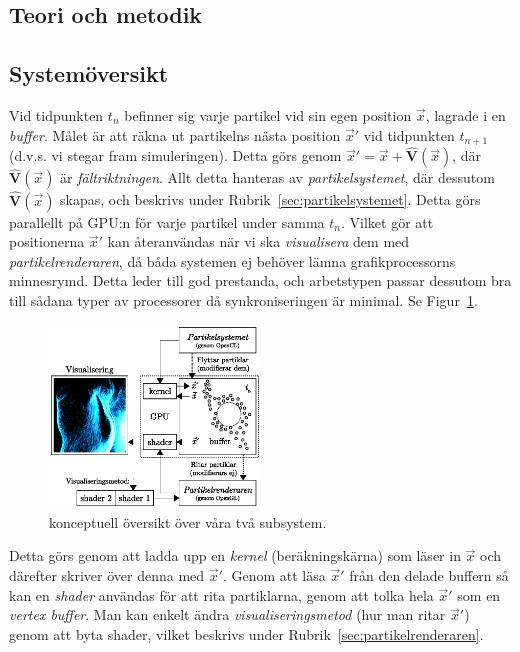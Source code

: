 \documentclass[a4paper]{article}
\begin{document}
\begin{multicols}{2}
    \section{Teori och metodik}
    \vspace{-0.3cm}
    \subsection{Systemöversikt} \label{sec:system}

    Vid tidpunkten \(t_n\) befinner sig varje partikel vid sin egen position \(\vec{x}\), lagrade i en \emph{buffer}. Målet är att räkna ut partikelns nästa position \(\vec{x}'\) vid tidpunkten \(t_{n+1}\) (d.v.s. vi stegar fram simuleringen). Detta görs genom \(\vec{x}' = \vec{x} + \mathbf{\hat{V}}(\vec{x})\), där \(\mathbf{\hat{V}}(\vec{x})\) är \emph{fältriktningen}. Allt detta hanteras av \emph{partikelsystemet}, där dessutom \(\mathbf{\hat{V}}(\vec{x})\) skapas, och beskrivs under Rubrik~\ref{sec:partikelsystemet}. Detta görs parallellt på GPU:n för varje partikel under samma \(t_n\). Vilket gör att positionerna \(\vec{x}'\) kan återanvändas när vi ska \emph{visualisera} dem med \emph{partikelrenderaren}, då båda systemen ej behöver lämna grafikprocessorns minnesrymd. Detta leder till god prestanda, och arbetstypen passar dessutom bra till sådana typer av processorer då synkroniseringen är minimal. Se Figur~\ref{fig:system}.

    \begin{figure}[H]
    \center
    \includegraphics[width=0.5\textwidth]{share/System.eps}
    \caption{konceptuell översikt över våra två subsystem.}
    \label{fig:system}
    \end{figure}

    Detta görs genom att ladda upp en \emph{kernel} (beräkningskärna) som läser in \(\vec{x}\) och därefter skriver över denna med \(\vec{x}'\). Genom att läsa \(\vec{x}'\) från den delade buffern så kan en \emph{shader} användas för att rita partiklarna, genom att tolka hela \(\vec{x}'\) som en \emph{vertex buffer}. Man kan enkelt ändra \emph{visualiseringsmetod} (hur man ritar \(\vec{x}'\)) genom att byta shader, vilket beskrivs under Rubrik~\ref{sec:partikelrenderaren}.


\end{multicols}
\end{document}
